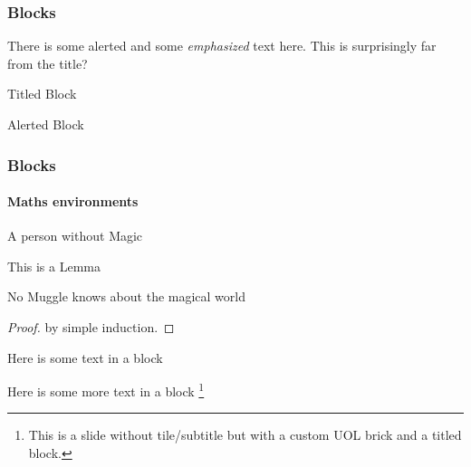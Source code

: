 \documentclass[aspectratio=169]{beamer}
\begin{document}
\begin{frame}
\frametitle{Blocks}
There is some \alert{alerted} and some \emph{emphasized} text here. This is surprisingly far from the title?
\begin{block}{Titled Block}
    \lipsum[1][1-2] 
\end{block}
\begin{alertblock}{Alerted Block}
    \lipsum[1][1-2] 
\end{alertblock}
\begin{example}[Muggle]
\end{example}

\end{frame}
\begin{frame}
\frametitle{Blocks}
\framesubtitle{Maths environments}

\begin{definition}[Muggle]
A person without Magic
\end{definition}

\begin{lemma}
    This is a Lemma
\end{lemma}
\begin{theorem}
No Muggle knows about the magical world
\end{theorem} 
\begin{proof}
    by simple induction.
\end{proof}

\end{frame}

% 
%
\begin{frame}
    \begin{block}{Here is some text in a block}
      \lipsum[1][1-5]
    \end{block}
\end{frame}

\begin{frame}
    \begin{block}{Here is some more text in a block}
        \lipsum[1][1-5]\footnote{This is a slide without tile/subtitle but with a custom UOL brick and a titled block.}
    \end{block}
\end{frame}
\end{document}
